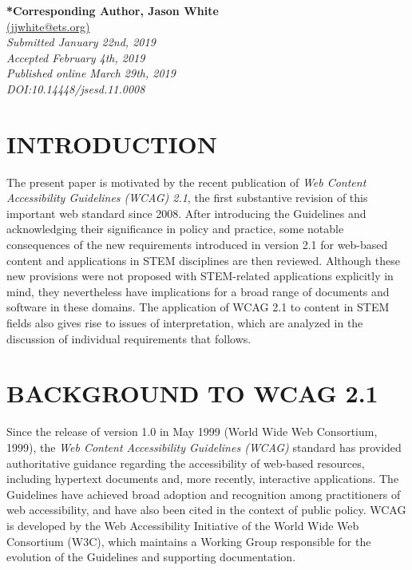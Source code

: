 \documentclass[11.5pt]{sig-alternate} %
\begin{document}
\textbf{*Corresponding Author, Jason White}\\
\href{mailto: jjwhite@ets.org }{(jjwhite@ets.org)} \\
\textit{Submitted  January 22nd, 2019}\\
\textit{Accepted February 4th, 2019} \\
\textit{Published online March 29th, 2019} \\
\textit{DOI:10.14448/jsesd.11.0008} \\
\pagebreak
\clearpage
\begin{large}

\section*{INTRODUCTION}
The present paper is motivated by the recent publication of \textit{Web Content Accessibility Guidelines (WCAG) 2.1}, the first substantive revision of this important web standard since 2008. After introducing the Guidelines and acknowledging their significance in policy and practice, some notable consequences of the new requirements introduced in version 2.1 for web-based content and applications in STEM disciplines are then reviewed. Although these new provisions were not proposed with STEM-related applications explicitly in mind, they nevertheless have implications for a broad range of documents and software in these domains. The application of WCAG 2.1 to content in STEM fields also gives rise to issues of interpretation, which are analyzed in the discussion of individual requirements that follows.

\section*{BACKGROUND TO WCAG 2.1}

Since the release of version 1.0 in May 1999 (World Wide Web Consortium, 1999), the \textit{Web Content Accessibility Guidelines (WCAG)} standard has provided authoritative guidance regarding the accessibility of web-based resources, including hypertext documents and, more recently, interactive applications. The Guidelines have achieved broad adoption and recognition among practitioners of web accessibility, and have also been cited in the context of public policy. WCAG is developed by the Web Accessibility Initiative of the World Wide Web Consortium (W3C), which maintains a Working Group responsible for the evolution of the Guidelines and supporting documentation.


\end{large}
\end{document}
